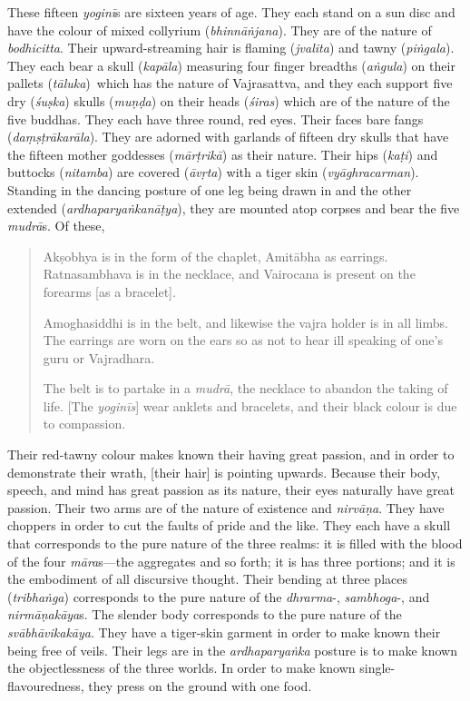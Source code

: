 \documentclass[naipra.tex]{subfiles}
\begin{document}
These fifteen \emph{yoginī}s are sixteen years of age.
They each stand on a sun disc and have the colour of mixed collyrium (\emph{bhinnāṅjana}).
They are of the nature of \emph{bodhicitta}.
Their upward-streaming hair is flaming (\emph{jvalita}) and tawny (\emph{piṅgala}).
They each bear a skull (\emph{kapāla}) measuring four finger breadths (\emph{aṅgula}) \crux on their pallets (\emph{tāluka})\crux\ which has the nature of Vajrasattva, and they each support five dry (\emph{śuṣka}) skulls (\emph{muṇḍa}) on their heads (\emph{śiras}) which are of the nature of the five buddhas.
They each have three round, red eyes.
Their faces bare fangs (\emph{daṃṣṭrākarāla}).
They are adorned with garlands of fifteen dry skulls that have the fifteen mother goddesses (\emph{mārṭrikā}) as their nature.
Their hips (\emph{kaṭi}) and buttocks (\emph{nitamba}) are covered (\emph{āvṛta}) with a tiger skin (\emph{vyāghracarman}).
Standing in the dancing posture of one leg being drawn in and the other extended (\emph{ardhaparyaṅkanāṭya}), they are mounted atop corpses and bear the five \emph{mudrā}s. 
Of these,

\begin{quote}
	Akṣobhya is in the form of the chaplet, Amitābha as earrings.
	Ratnasambhava is in the necklace, and Vairocana is present on the forearms [as a bracelet].
	
	Amoghasiddhi is in the belt, and likewise the vajra holder is in all limbs.
	The earrings are worn on the ears so as not to hear ill speaking of one's guru or Vajradhara.

	The belt is to partake in a \emph{mudrā}, the necklace to abandon the taking of life. 
	[The \emph{yoginīs}] wear anklets and bracelets, and their black colour is due to compassion.
\end{quote}

Their red-tawny colour makes known their having great passion, and in order to demonstrate their wrath, [their hair] is pointing upwards.
Because their body, speech, and mind has great passion as its nature, their eyes naturally have great passion.
Their two arms are of the nature of existence and \emph{nirvāṇa}.
They have choppers in order to cut the faults of pride and the like.
They each have a skull that corresponds to the pure nature of the three realms: it is filled with the blood of the four \emph{māra}s—the aggregates and so forth; it is has three portions; and it is the embodiment of all discursive thought.
Their bending at three places (\emph{tribhaṅga}) corresponds to the pure nature of the \emph{dhrarma}-, \emph{sambhoga}-, and \emph{nirmāṇakāya}s.
The slender body corresponds to the pure nature of the \emph{svābhāvikakāya}.
They have a tiger-skin garment in order to make known their being free of veils.
Their legs are \crux in the \emph{ardhaparyaṅka} posture \crux is to make known the objectlessness of the three worlds.
In order to make known single-flavouredness, they press on the ground with one food.
\end{document}
